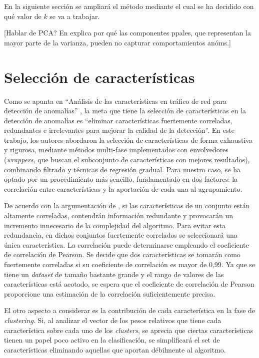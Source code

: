 En la siguiente sección se ampliará el método mediante el cual se ha decidido con qué valor de $k$ se va a trabajar.

[Hablar de PCA? En \cite{Bohara_2016} explica por qué las componentes ppales, que representan la mayor parte de la varianza, pueden no capturar comportamientos anóms.]

\section{Selección de características}\label{sec:selecciondecaracteristicas}

Como se apunta en ``Análisis de las características en tráfico de red para detección de anomalías'' \cite{Iglesias_2015},
la meta que tiene la selección de características en la detección de anomalías es
``eliminar características fuertemente correladas, redundantes e irrelevantes para mejorar la calidad de la detección''.
En este trabajo, los autores abordaron la selección de características de forma exhaustiva y rigurosa,
mediante métodos multi-fase implementados con envolvedores (\emph{wrappers}, que buscan el subconjunto de características con mejores resultados),
combinando filtrado y técnicas de regresión gradual.
Para nuestro caso, se ha optado por un procedimiento más sencillo, fundamentado en dos factores: la correlación entre características y la aportación de cada una al agrupamiento.

De acuerdo con la argumentación de \cite{Bohara_2016}, si las características de un conjunto están altamente correladas,
contendrán información redundante y provocarán un incremento innecesario de la complejidad del algoritmo.
Para evitar esta redundancia, en dichos conjuntos fuertemente correlados se seleccionará una única característica.
La correlación puede determinarse empleando el coeficiente de correlación de Pearson.
Se decide que dos características se tomarán como fuertemente correladas si su coeficiente de correlación es mayor de 0,99.
Ya que se tiene un \emph{dataset} de tamaño bastante grande y el rango de valores de las características está acotado,
se espera que el coeficiente de correlación de Pearson proporcione una estimación de la correlación suficientemente precisa.

El otro aspecto a considerar es la contribución de cada característica en la fase de \emph{clustering}.
Si, al analizar el vector de los pesos relativos que tiene cada característica sobre cada uno de los \emph{clusters},
se aprecia que ciertas características tienen un papel poco activo en la clasificación,
se simplificará el set de características eliminando aquellas que aportan débilmente al algoritmo.

